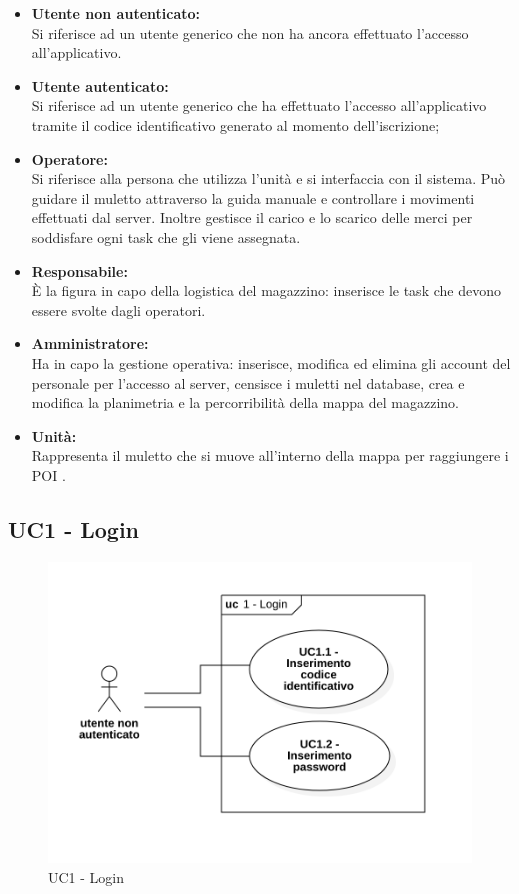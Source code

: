 \begin{itemize}
	\item{\textbf{Utente non autenticato:}\\
	Si riferisce ad un utente generico che non ha ancora effettuato l'accesso all'applicativo.}
	\item{\textbf{Utente autenticato:}\\
	Si riferisce ad un utente generico che ha effettuato l'accesso all'applicativo tramite il codice identificativo generato al momento dell'iscrizione;}
	\item{\textbf{Operatore:}\\
	Si riferisce alla persona che utilizza l'unità e si interfaccia con il sistema. Può guidare il muletto attraverso la guida manuale e controllare i movimenti effettuati dal server. Inoltre gestisce il carico e lo scarico delle merci per soddisfare ogni task che gli viene assegnata.}
	\item{\textbf{Responsabile:}\\
	 \`E la figura in capo della logistica del magazzino: inserisce le task che devono essere svolte dagli operatori.}
	\item{\textbf{Amministratore:}\\
 Ha in capo la gestione operativa: inserisce, modifica ed elimina gli account del personale per l'accesso al server, censisce i muletti nel database, crea e modifica la planimetria e la percorribilità della mappa del magazzino.}
	\item {\textbf{Unità:}\\
	Rappresenta il muletto che si muove all'interno della mappa per raggiungere i POI . }
\end{itemize}

\subsection{UC1 - Login}
\begin{figure}[H]
	\centering
	\includegraphics[scale=0.6]{res/images/uc1.PNG}
	\caption{UC1 - Login}
\end{figure}


